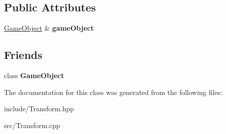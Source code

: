 \subsection*{Public Attributes}
\begin{DoxyCompactItemize}
\item 
\hypertarget{class_transform_afea9a04d0ed015813204e8b2d4c40666}{\hyperlink{class_game_object}{Game\-Object} \& {\bfseries game\-Object}}\label{class_transform_afea9a04d0ed015813204e8b2d4c40666}

\end{DoxyCompactItemize}
\subsection*{Friends}
\begin{DoxyCompactItemize}
\item 
\hypertarget{class_transform_a00df87c957d8f7ee0fc51f07a0542f4a}{class {\bfseries Game\-Object}}\label{class_transform_a00df87c957d8f7ee0fc51f07a0542f4a}

\end{DoxyCompactItemize}


The documentation for this class was generated from the following files\-:\begin{DoxyCompactItemize}
\item 
include/Transform.\-hpp\item 
src/Transform.\-cpp\end{DoxyCompactItemize}
